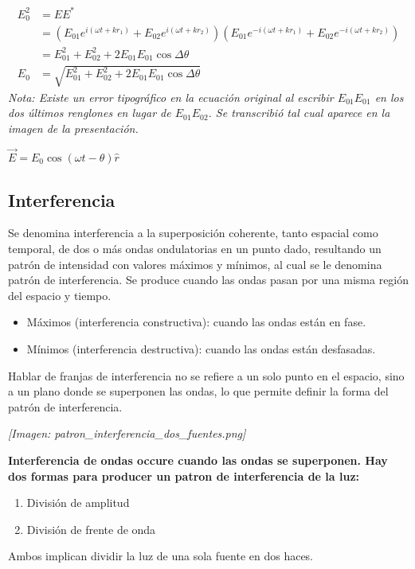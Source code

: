 \documentclass[12pt]{article}
\begin{document}
	\begin{align*}
		E_0^2 &= E E^* \\
		&= (E_{01}e^{i(\omega t + kr_1)} + E_{02}e^{i(\omega t + kr_2)})(E_{01}e^{-i(\omega t + kr_1)} + E_{02}e^{-i(\omega t + kr_2)}) \\
		&= E_{01}^2 + E_{02}^2 + 2E_{01}E_{01}\cos\Delta\theta \\
		E_0 &= \sqrt{E_{01}^2 + E_{02}^2 + 2E_{01}E_{01}\cos\Delta\theta}
	\end{align*}
	\textit{Nota: Existe un error tipográfico en la ecuación original al escribir $E_{01}E_{01}$ en los dos últimos renglones en lugar de $E_{01}E_{02}$. Se transcribió tal cual aparece en la imagen de la presentación.}
	
	\vspace{0.5cm}
	$\vec{E} = E_0 \cos(\omega t - \theta)\hat{r}$
	
	\subsection{Interferencia}
	Se denomina interferencia a la superposición coherente, tanto espacial como temporal, de dos o más ondas ondulatorias en un punto dado, resultando un patrón de intensidad con valores máximos y mínimos, al cual se le denomina patrón de interferencia. Se produce cuando las ondas pasan por una misma región del espacio y tiempo.
	
	\begin{itemize}
		\item Máximos (interferencia constructiva): cuando las ondas están en fase.
		\item Mínimos (interferencia destructiva): cuando las ondas están desfasadas.
	\end{itemize}
	
	Hablar de franjas de interferencia no se refiere a un solo punto en el espacio, sino a un plano donde se superponen las ondas, lo que permite definir la forma del patrón de interferencia.
	
	\textit{[Imagen: patron\_interferencia\_dos\_fuentes.png]}
	
	\textbf{Interferencia de ondas occure cuando las ondas se superponen. Hay dos formas para producer un patron de interferencia de la luz:}
	\begin{enumerate}
		\item División de amplitud
		\item División de frente de onda
	\end{enumerate}
	Ambos implican dividir la luz de una sola fuente en dos haces.
	
\end{document}
